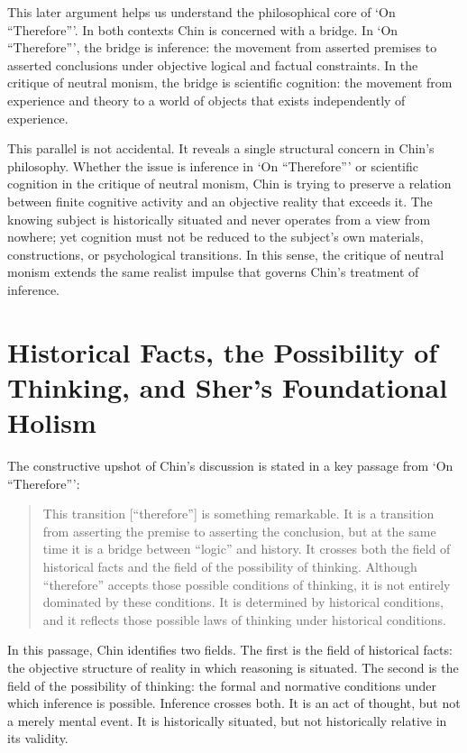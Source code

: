 \documentclass{birkjour}
\begin{document}
This later argument helps us understand the philosophical core of `On ``Therefore'''. In both contexts Chin is concerned with a bridge. In `On ``Therefore''', the bridge is inference: the movement from asserted premises to asserted conclusions under objective logical and factual constraints. In the critique of neutral monism, the bridge is scientific cognition: the movement from experience and theory to a world of objects that exists independently of experience. 

This parallel is not accidental. It reveals a single structural concern in Chin's philosophy. Whether the issue is inference in `On ``Therefore''' or scientific cognition in the critique of neutral monism, Chin is trying to preserve a relation between finite cognitive activity and an objective reality that exceeds it. The knowing subject is historically situated and never operates from a view from nowhere; yet cognition must not be reduced to the subject's own materials, constructions, or psychological transitions. In this sense, the critique of neutral monism extends the same realist impulse that governs Chin's treatment of inference.

\section{Historical Facts, the Possibility of Thinking, and Sher's Foundational Holism}

The constructive upshot of Chin's discussion is stated in a key passage from `On ``Therefore''':

\begin{quote}
This transition [``therefore''] is something remarkable. It is a transition from asserting the premise to asserting the conclusion, but at the same time it is a bridge between ``logic'' and history. It crosses both the field of historical facts and the field of the possibility of thinking. Although ``therefore'' accepts those possible conditions of thinking, it is not entirely dominated by these conditions. It is determined by historical conditions, and it reflects those possible laws of thinking under historical conditions.~\cite[pp.~47--48]{Liu2017}
\end{quote}

In this passage, Chin identifies two fields. The first is the field of historical facts: the objective structure of reality in which reasoning is situated. The second is the field of the possibility of thinking: the formal and normative conditions under which inference is possible. Inference crosses both. It is an act of thought, but not a merely mental event. It is historically situated, but not historically relative in its validity.
\end{document}

